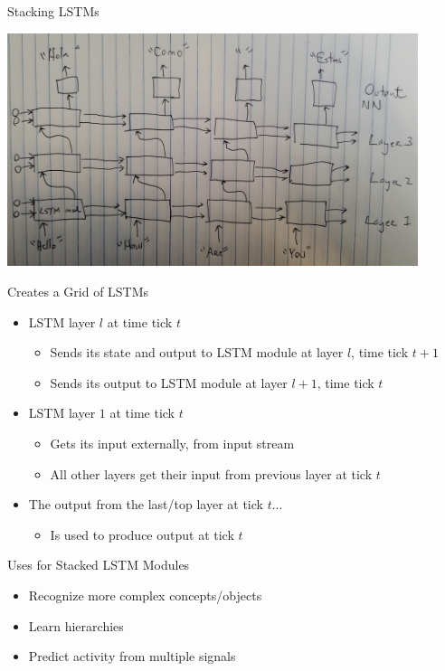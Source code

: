 \documentclass[aspectratio=169]{beamer}
\begin{document}
\begin{frame}{Stacking LSTMs}

\includegraphics[width=0.9\textwidth]{lectLSTM/Stacked.jpg}
\end{frame}
\begin{frame}{Creates a Grid of LSTMs}
\begin{itemize}
	\item LSTM layer $l$ at time tick $t$
	\begin{itemize}
		\item Sends its state and output to LSTM module at layer $l$, time tick $t + 1$
		\item Sends its output to LSTM module at layer $l + 1$, time tick $t$
	\end{itemize}
	\item LSTM layer $1$ at time tick $t$
	\begin{itemize}
		\item Gets its input externally, from input stream
		\item All other layers get their input from previous layer at tick $t$
	\end{itemize}
	\item The output from the last/top layer at tick $t$...
	\begin{itemize}
		\item Is used to produce output at tick $t$
	\end{itemize}
\end{itemize}
\end{frame}
\begin{frame}{Uses for Stacked LSTM Modules}

\begin{itemize}
	\item Recognize more complex concepts/objects %
	\item Learn hierarchies
	\item Predict activity from multiple signals
\end{itemize}
\end{frame}
\end{document}
